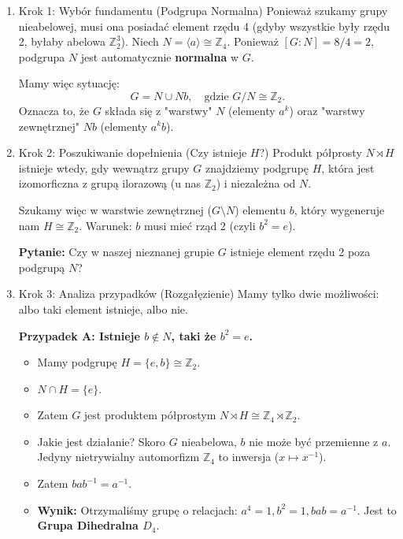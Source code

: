\begin{enumerate}[label=\Roman*]
\item{Krok 1: Wybór fundamentu (Podgrupa Normalna)}
    Ponieważ szukamy grupy nieabelowej, musi ona posiadać element rzędu 4 (gdyby wszystkie były rzędu 2, byłaby abelowa $\mathbb{Z}_2^3$).
    Niech $N = \langle a \rangle \cong \mathbb{Z}_4$.
    Ponieważ $[G:N] = 8/4 = 2$, podgrupa $N$ jest automatycznie \textbf{normalna} w $G$.
    
    Mamy więc sytuację:
    \[ G = N \cup Nb, \quad \text{gdzie } G/N \cong \mathbb{Z}_2. \]
    Oznacza to, że $G$ składa się z "warstwy" $N$ (elementy $a^k$) oraz "warstwy zewnętrznej" $Nb$ (elementy $a^k b$).
 

\item{Krok 2: Poszukiwanie dopełnienia (Czy istnieje $H$?)}
    Produkt półprosty $N \rtimes H$ istnieje wtedy, gdy wewnątrz grupy $G$ znajdziemy podgrupę $H$, która jest izomorficzna z grupą ilorazową (u nas $\mathbb{Z}_2$) i niezależna od $N$.
    
    Szukamy więc w warstwie zewnętrznej ($G \setminus N$) elementu $b$, który wygeneruje nam $H \cong \mathbb{Z}_2$.
    Warunek: $b$ musi mieć rząd 2 (czyli $b^2 = e$).
    
    \textbf{Pytanie:} Czy w naszej nieznanej grupie $G$ istnieje element rzędu 2 poza podgrupą $N$?
 

\item{Krok 3: Analiza przypadków (Rozgałęzienie)}
    Mamy tylko dwie możliwości: albo taki element istnieje, albo nie.
    
    \textbf{Przypadek A: Istnieje $b \notin N$, taki że $b^2 = e$.}
    \begin{itemize}
        \item Mamy podgrupę $H = \{e, b\} \cong \mathbb{Z}_2$.
        \item $N \cap H = \{e\}$.
        \item Zatem $G$ jest produktem półprostym $N \rtimes H \cong \mathbb{Z}_4 \rtimes \mathbb{Z}_2$.
        \item Jakie jest działanie? Skoro $G$ nieabelowa, $b$ nie może być przemienne z $a$. Jedyny nietrywialny automorfizm $\mathbb{Z}_4$ to inwersja ($x \mapsto x^{-1}$).
        \item Zatem $bab^{-1} = a^{-1}$.
        \item \textbf{Wynik:} Otrzymaliśmy grupę o relacjach: $a^4=1, b^2=1, bab=a^{-1}$. Jest to \textbf{Grupa Dihedralna $D_4$}.
    \end{itemize}


\end{enumerate}
